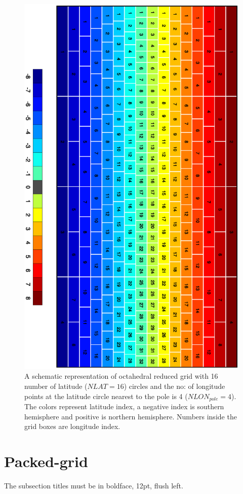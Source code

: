 \documentclass{SBCbookchapter}
\begin{document}
\begin{figure}[H]
	\includegraphics[angle=90,width=\linewidth]{grid2}
	\caption{A schematic representation of octahedral reduced grid with 16 number of latitude ($NLAT=16$) circles and the no: of longitude points at the latitude circle nearest to the pole is 4 ($NLON_{pole}=4$). The colors represent latitude index, a negative index is southern hemisphere and positive is northern hemisphere. Numbers inside the grid boxes are longitude index.}
	\label{figone}
\end{figure}

\section{Packed-grid}
The subsection titles must be in boldface, 12pt, flush left.
\end{document}
